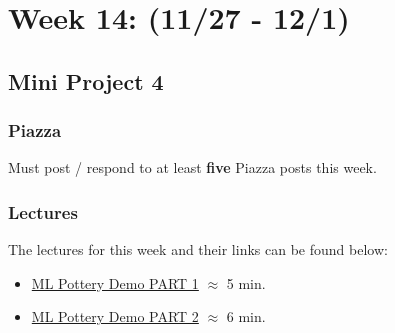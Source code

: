 \clearpage
\chapter{Week 14: (11/27 - 12/1)}

\section{Mini Project 4}




\subsection{Piazza}

Must post / respond to at least \textbf{five} Piazza posts this week.  

\subsection{Lectures}

The lectures for this week and their links can be found below:

\begin{itemize}
    \item \href{https://applied.cs.colorado.edu/mod/hvp/view.php?id=49426}{ML Pottery Demo PART 1} $\approx$ 5 min.
    \item \href{https://applied.cs.colorado.edu/mod/hvp/view.php?id=49427}{ML Pottery Demo PART 2} $\approx$ 6 min.
\end{itemize}



